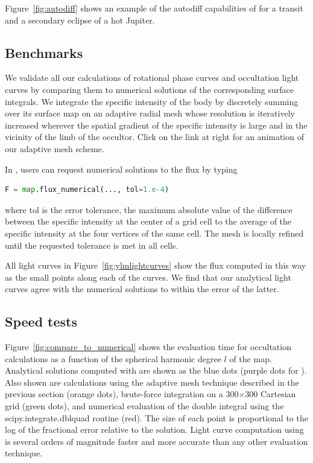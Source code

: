 \documentclass[modern]{aastex61}
\begin{document}
%
Figure~\ref{fig:autodiff} shows an example of the autodiff capabilities of
\starry for a transit and a secondary eclipse of a hot Jupiter.

\subsection{Benchmarks}
\label{sec:starrybenchmarks}

We validate all our calculations of rotational phase curves and occultation
light curves by comparing them to numerical solutions of the corresponding
surface integrals. We integrate the specific intensity of the body by
discretely summing over its surface map on an adaptive radial mesh whose
resolution is iteratively increased wherever the spatial gradient of the
specific intensity is large and in the vicinity of the limb of the occultor.
 Click on the link at right for an animation of our
adaptive mesh scheme.

In \starry, users can request numerical solutions to the flux by typing
%
\begin{lstlisting}[language=Python,firstnumber=last]
F = map.flux_numerical(..., tol=1.e-4)
\end{lstlisting}
%
where \textsf{tol} is the error tolerance, the maximum absolute value of the
difference between the
specific intensity at the center of a grid cell to the average of the specific
intensity at the four vertices of the same cell. The mesh is locally
refined until the requested tolerance is met in all cells.

All light curves in Figure~\ref{fig:ylmlightcurves} show the flux computed
in this way as the small points along each of the curves. We find that our
analytical light curves agree with the numerical solutions to within the error
of the latter.

\subsection{Speed tests}
\label{sec:starryspeed}

Figure~\ref{fig:compare_to_numerical} shows the evaluation time for
occultation calculations as a function of the spherical
harmonic degree $l$ of the map. Analytical solutions computed with \starry
are shown as the blue dots (purple dots for \starrygrad). Also shown are calculations using the adaptive
mesh technique described in the previous section (orange dots),
brute-force integration on a 300$\times$300 Cartesian grid (green dots),
and numerical evaluation of the double integral using the
\textsf{scipy.integrate.dblquad} \citep{scipy} routine (red). The size of each point
is proportional to the log of the fractional error relative to the
\starry solution. Light curve computation using \starry is several orders of
magnitude faster and more accurate than any other evaluation technique.
\end{document}
